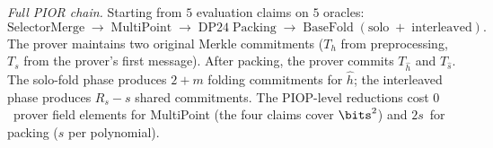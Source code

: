 \emph{Full PIOR chain.} Starting from $5$ evaluation claims on $5$ oracles:
\[
    \mathrm{SelectorMerge} \;\to\; \mathrm{MultiPoint} \;\to\; \mathrm{DP24\;Packing} \;\to\; \mathrm{BaseFold\;(solo\;+\;interleaved)}.
\]
The prover maintains two original Merkle commitments ($T_h$ from preprocessing, $T_s$ from the prover's first message). After packing, the prover commits $T_{\hat{h}}$ and $T_{\hat{s}}$. The solo-fold phase produces $2 + m$ folding commitments for $\hat{h}$; the interleaved phase produces $R_s - s$ shared commitments. The PIOP-level reductions cost $0$~prover field elements for MultiPoint (the four claims cover $\bits^2$) and $2s$~for packing ($s$ per polynomial).